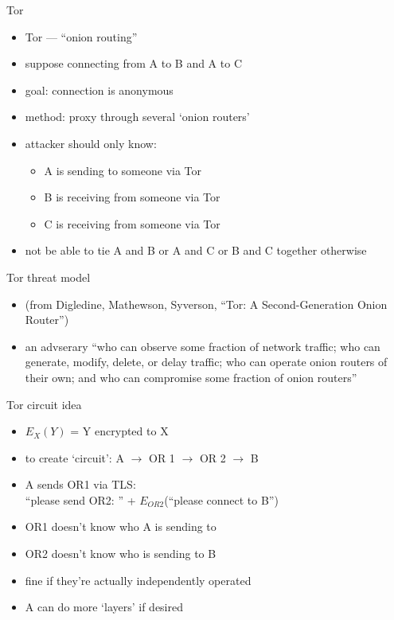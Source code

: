 \begin{frame}{Tor}
    \begin{itemize}
    \item Tor --- ``onion routing''
    \item suppose connecting from A to B and A to C
    \item goal: connection is anonymous
    \item method: proxy through several `onion routers'
    \vspace{.5cm}
    \item attacker should only know:
        \begin{itemize}
        \item A is sending to someone via Tor
        \item B is receiving from someone via Tor
        \item C is receiving from someone via Tor
        \end{itemize}
    \item not be able to tie A and B or A and C or B and C together otherwise
    \end{itemize}
\end{frame}

\begin{frame}{Tor threat model}
    \begin{itemize}
    \item (from Digledine, Mathewson, Syverson, ``Tor: A Second-Generation Onion Router'')
    \item an advserary ``who can observe some fraction of network traffic; who can generate, modify,
        delete, or delay traffic; who can operate onion routers of their own; and who can compromise some
        fraction of onion routers''
    \end{itemize}
\end{frame}

\begin{frame}{Tor circuit idea}
    \begin{itemize}
    \item $E_X(Y)$ = Y encrypted to X
    \item to create `circuit': A $\rightarrow$ OR 1 $\rightarrow$ OR 2 $\rightarrow$ B
    \item A sends OR1 via TLS: \\
        ``please send OR2: '' + $E_{OR2}$(``please connect to B'')
    \vspace{.5cm}
    \item OR1 doesn't know who A is sending to
    \item OR2 doesn't know who is sending to B
    \item fine if they're actually independently operated
    \item A can do more `layers' if desired
    \end{itemize}
\end{frame}

